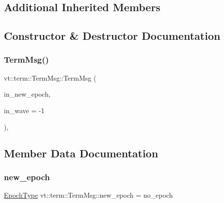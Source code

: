 \subsection*{Additional Inherited Members}


\subsection{Constructor \& Destructor Documentation}
\mbox{\label{structvt_1_1term_1_1_term_msg_a099cbed49c4d73d9627c20463334db39}} 
\subsubsection{\texorpdfstring{Term\+Msg()}{TermMsg()}}
{\footnotesize\ttfamily vt\+::term\+::\+Term\+Msg\+::\+Term\+Msg (\begin{DoxyParamCaption}\item[{\hyperlink{namespacevt_a81d11b28122d43bf9834577e4a06440f}{Epoch\+Type} const \&}]{in\+\_\+new\+\_\+epoch,  }\item[{\hyperlink{namespacevt_1_1term_a4fd378cdb0c36683afc1b3399d685f7f}{Term\+Counter\+Type}}]{in\+\_\+wave = {\ttfamily -\/1} }\end{DoxyParamCaption})\hspace{0.3cm}{\ttfamily [inline]}, {\ttfamily [explicit]}}



\subsection{Member Data Documentation}
\mbox{\label{structvt_1_1term_1_1_term_msg_a1890be8aa1a0d1a148331d3c0ea229e3}} 
\subsubsection{\texorpdfstring{new\+\_\+epoch}{new\_epoch}}
{\footnotesize\ttfamily \hyperlink{namespacevt_a81d11b28122d43bf9834577e4a06440f}{Epoch\+Type} vt\+::term\+::\+Term\+Msg\+::new\+\_\+epoch = no\+\_\+epoch}

